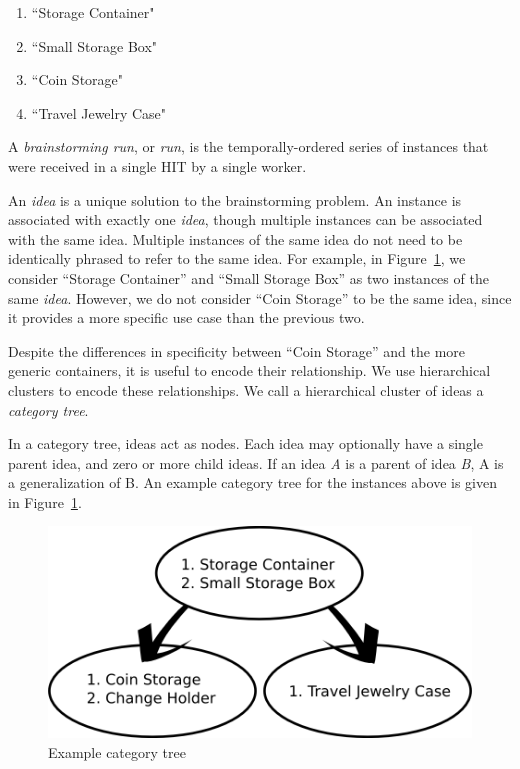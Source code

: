 \begin{enumerate}
    \item ``Storage Container"
    \item ``Small Storage Box"
    \item ``Coin Storage"
    \item ``Travel Jewelry Case"
\end{enumerate}

A \emph{brainstorming run}, or \emph{run}, is the temporally-ordered series of instances that were received in a single HIT by a single worker.

An \emph{idea} is a unique solution to the brainstorming problem. An instance is associated with exactly one \emph{idea}, though multiple instances can be associated with the same idea. Multiple instances of the same idea do not need to be identically phrased to refer to the same idea. For example, in Figure~\ref{fig:example_instances}, we consider ``Storage Container'' and ``Small Storage Box'' as two instances of the same \emph{idea}. However, we do not consider ``Coin Storage'' to be the same idea, since it provides a more specific use case than the previous two.

Despite the differences in specificity between ``Coin Storage'' and the more generic containers, it is useful to encode their relationship. We use hierarchical clusters to encode these relationships. We call a hierarchical cluster of ideas a \emph{category tree}.

In a category tree, ideas act as nodes. Each idea may optionally have a single parent idea, and zero or more child ideas. If an idea \emph{A} is a parent of idea \emph{B}, A is a generalization of B. An example category tree for the instances above is given in Figure~\ref{fig:example_instances}.

\begin{figure}[!h]
    \centering
    \includegraphics[width=0.9\columnwidth]{example_instances}
    \caption{Example category tree}
    \label{fig:example_instances}
\end{figure}

